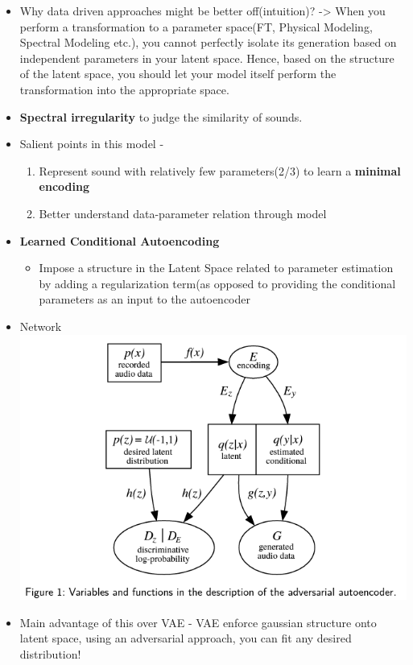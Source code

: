 \documentclass[11pt]{article}
\makeatletter
\def\maxwidth{\ifdim\Gin@nat@width>\linewidth\linewidth
    \else\Gin@nat@width\fi}
\let\Oldincludegraphics\includegraphics
\renewcommand{\includegraphics}[1]{\Oldincludegraphics[width=.8\maxwidth]{#1}}
\providecommand{\tightlist}{%
      \setlength{\itemsep}{0pt}\setlength{\parskip}{0pt}}
\makeatother
\begin{document}
    \begin{itemize}
\tightlist
\item
  Why data driven approaches might be better off(intuition)?
  -\textgreater{} When you perform a transformation to a parameter
  space(FT, Physical Modeling, Spectral Modeling etc.), you cannot
  perfectly isolate its generation based on independent parameters in
  your latent space. Hence, based on the structure of the latent space,
  you should let your model itself perform the transformation into the
  appropriate space.
\item
  \textbf{Spectral irregularity} to judge the similarity of sounds.
\item
  Salient points in this model -

  \begin{enumerate}
  \def\labelenumi{\arabic{enumi}.}
  \tightlist
  \item
    Represent sound with relatively few parameters(2/3) to learn a
    \textbf{minimal encoding}
  \item
    Better understand data-parameter relation through model
  \end{enumerate}
\item
  \textbf{Learned Conditional Autoencoding}

  \begin{itemize}
  \tightlist
  \item
    Impose a structure in the Latent Space related to parameter
    estimation by adding a regularization term(as opposed to providing
    the conditional parameters as an input to the autoencoder
  \end{itemize}
\item
  Network \includegraphics{fig_09.PNG}
\item
  Main advantage of this over VAE - VAE enforce gaussian structure onto
  latent space, using an adversarial approach, you can fit any desired
  distribution!
\end{itemize}


    
    
    
    
\end{document}
